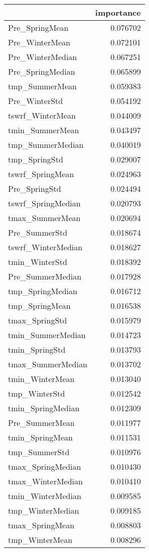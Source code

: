 \begin{tabular}{lr}
\toprule
 & importance \\
\midrule
Pre_SpringMean & 0.076702 \\
Pre_WinterMean & 0.072101 \\
Pre_WinterMedian & 0.067251 \\
Pre_SpringMedian & 0.065899 \\
tmp_SummerMean & 0.059383 \\
Pre_WinterStd & 0.054192 \\
tswrf_WinterMean & 0.044009 \\
tmin_SummerMean & 0.043497 \\
tmp_SummerMedian & 0.040019 \\
tmp_SpringStd & 0.029007 \\
tswrf_SpringMean & 0.024963 \\
Pre_SpringStd & 0.024494 \\
tswrf_SpringMedian & 0.020793 \\
tmax_SummerMean & 0.020694 \\
Pre_SummerStd & 0.018674 \\
tswrf_WinterMedian & 0.018627 \\
tmin_WinterStd & 0.018392 \\
Pre_SummerMedian & 0.017928 \\
tmp_SpringMedian & 0.016712 \\
tmp_SpringMean & 0.016538 \\
tmax_SpringStd & 0.015979 \\
tmin_SummerMedian & 0.014723 \\
tmin_SpringStd & 0.013793 \\
tmax_SummerMedian & 0.013702 \\
tmin_WinterMean & 0.013040 \\
tmp_WinterStd & 0.012542 \\
tmin_SpringMedian & 0.012309 \\
Pre_SummerMean & 0.011977 \\
tmin_SpringMean & 0.011531 \\
tmp_SummerStd & 0.010976 \\
tmax_SpringMedian & 0.010430 \\
tmax_WinterMedian & 0.010410 \\
tmin_WinterMedian & 0.009585 \\
tmp_WinterMedian & 0.009185 \\
tmax_SpringMean & 0.008803 \\
tmp_WinterMean & 0.008296 \\

\end{tabular}
